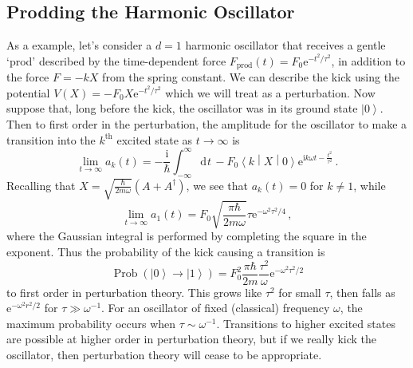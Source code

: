 \documentclass{article}
\theoremstyle{plain}\theoremheaderfont{\normalfont\itshape}\theorembodyfont{\rmfamily}\theoremseparator{.}\newtheorem*{rem}{Remark}\newtheorem*{ex}{Example}\newtheorem*{proof}{Proof}\newtheorem*{altp}{Alternative proof}
\theoremstyle{plain}\theoremheaderfont{\normalfont\bfseries}\theorembodyfont{\rmfamily}\theoremseparator{.}\newtheorem{thm}{Theorem}[section]\newtheorem{lem}[thm]{Lemma}\newtheorem{prop}[thm]{Proposition}\newtheorem*{cor}{Corollary}\newtheorem{defn}[thm]{Definition}\newtheorem{clm}[thm]{Claim}\newtheorem{clminproof}{Claim}
\theoremstyle{break}\theoremheaderfont{\normalfont\itshape}\theorembodyfont{\rmfamily}\theoremseparator{.\medskip}\newtheorem*{proofskip}{Proof}\newtheorem*{exs}{Examples}\newtheorem*{rems}{Remarks}
\theoremstyle{break}\theoremheaderfont{\normalfont\bfseries}\theorembodyfont{\rmfamily}\theoremseparator{.\medskip}\newtheorem{lemskip}[thm]{Lemma}\newtheorem{defnskip}[thm]{Definition}\newtheorem{propskip}[thm]{Proposition}\newtheorem{thmskip}[thm]{Theorem}
\numberwithin{equation}{section}
\newcommand{\ii}{\mathrm{i}}
\newcommand{\ee}{\mathrm{e}}
\newcommand{\dd}[2][]{\mathrm{d}^{#1} #2\,}
\newcommand{\ket}[1]{\left| #1 \right\rangle}
\newcommand{\mel}[3]{\left\langle #1 \middle| #2 \middle| #3 \right\rangle}
\DeclareMathOperator{\Prob}{Prob}
\begin{document}
    \subsection{Prodding the Harmonic Oscillator}
    As a example, let's consider a \(d=1\) harmonic oscillator that receives a gentle `prod' described by the time-dependent force \(F_{\text{prod}}(t)=F_0 \ee^{-t^2/\tau^2}\), in addition to the force \(F=-kX\) from the spring constant. We can describe the kick using the potential \(V(X)=-F_0X \ee^{-t^2/\tau^2}\) which we will treat as a perturbation. Now suppose that, long before the kick, the oscillator was in its ground state \(\ket{0}\). Then to first order in the perturbation, the amplitude for the oscillator to make a transition into the \(k^{\text{th}}\) excited state as \(t\to\infty\) is
    \begin{equation}
        \lim_{t\to\infty}a_k(t)=-\frac{\ii}{\hbar}\int_{-\infty}^{\infty}\dd{t}-F_0\mel{k}{X}{0}\ee^{\ii k\omega t - \frac{t^2}{\tau^2}}\,.
    \end{equation}
    Recalling that \(X=\sqrt{\frac{\hbar}{2m\omega}}(A+A^\dagger)\), we see that \(a_k(t)=0\) for \(k\ne 1\), while
    \begin{equation}
        \lim_{t\to\infty}a_1(t)=F_0\sqrt{\frac{\pi\hbar}{2m\omega}}\tau \ee^{-\omega^2\tau^2/4}\,,
    \end{equation}
    where the Gaussian integral is performed by completing the square in the exponent. Thus the probability of the kick causing a transition is
    \begin{equation}
        \Prob(\ket{0}\to\ket{1})=F_0^2\frac{\pi\hbar}{2m}\frac{\tau^2}{\omega}\ee^{-\omega^2\tau^2/2}
    \end{equation}
    to first order in perturbation theory. This grows like \(\tau^2\) for small \(\tau\), then falls as \(\ee^{-\omega^2 r^2/2}\) for \(\tau\gg\omega^{-1}\). For an oscillator of fixed (classical) frequency \(\omega\), the maximum probability occurs when \(\tau\sim\omega^{-1}\). Transitions to higher excited states are possible at higher order in perturbation theory, but if we really kick the oscillator, then perturbation theory will cease to be appropriate.
\end{document}
